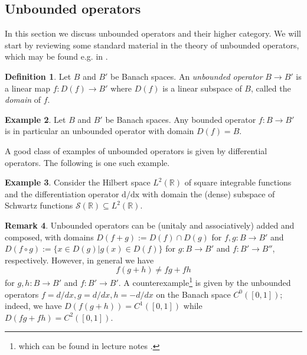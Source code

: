 \documentclass{article}
\numberwithin{equation}{section}
\theoremstyle{definition}
\newtheorem{definition}{Definition}[subsection]
\newtheorem{example}[definition]{Example}
\newtheorem{remark}[definition]{Remark}
\theoremstyle{theorem}
\begin{document}
\subsection{Unbounded operators}\label{Subsection: unbounded operators}
In this section we discuss unbounded operators and their higher category. We will start by reviewing some standard material in the theory of 
unbounded operators, which may be found e.g. in \cite{Schmuedgen2012unbounded}.
\begin{definition}
    Let $B$ and $B'$ be Banach spaces. An \emph{unbounded operator} $B \to B'$ is a linear map $f \colon D(f) \to B'$ where $D(f)$ is a linear subspace of $B$, 
    called the \emph{domain} of $f$. 
\end{definition}
\begin{example}
    Let $B$ and $B'$ be Banach spaces. Any bounded operator $f \colon B \to B'$ is in particular an unbounded operator with domain $D(f)=B$. 
\end{example}
A good class of examples of unbounded operators is given by differential operators. The following is one such example.
\begin{example}
    Consider the Hilbert space $L^2(\mathbb{R})$ of square integrable functions and the differentiation operator $\mathrm{d}/\mathrm{d}\mathrm{x}$ with domain 
    the (dense) subspace of Schwartz functions $\mathcal{S}(\mathbb{R}) \subseteq L^2(\mathbb{R})$.
\end{example}
\begin{remark}\label{Remark: composition of unbounded operators}
    Unbounded operators can be (unitaly and associatively) added and composed, with domains $D(f + g) := D(f) \cap D(g)$ for $f,g \colon B \to B'$ and 
    $D(f \circ g) := \{x \in D(g) | g(x) \in D(f) \}$ for $g \colon B \to B'$ and $f \colon B' \to B''$, respectively. However, in general we have 
    \begin{equation}
        f(g+h) \neq fg + fh
    \end{equation}
    for $g,h \colon B \to B'$ and $f \colon B' \to B'$. A counterexample\footnote{which can be found in lecture notes \cite{Remline2021unbounded}.} 
    is given by the unbounded operators $f = d/dx, g=d/dx, h = -d/dx$ on the Banach space $C^0([0,1])$; indeed, we have $D(f(g+h)) = C^1([0,1])$ while 
    $D(fg+fh) = C^2([0,1])$.
\end{remark}
\end{document}
